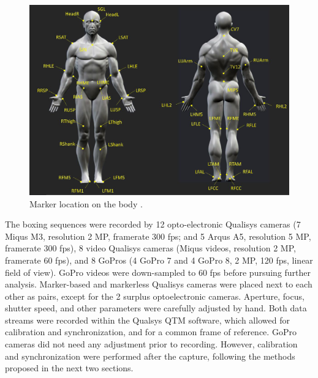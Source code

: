 \begin{figure}[!ht]
	\centering
	\def\svgwidth{1\columnwidth} 
	\fontsize{10pt}{10pt}\selectfont
	\includegraphics[width=\linewidth]{"../Chap6/Figures/Fig_MkBoxe.PNG"}
	\caption{Marker location on the body \cite{Lahkar2022b}.}
	\label{fig_mkboxe}
\end{figure}

The boxing sequences were recorded by 12 opto-electronic Qualisys cameras (7 Miqus M3, resolution 2 MP, framerate 300 fps; and 5 Arqus A5, resolution 5 MP, framerate 300 fps), 8 video Qualisys cameras (Miqus videos, resolution 2 MP, framerate 60 fps), and 8 GoPros (4 GoPro 7 and 4 GoPro 8, 2 MP, 120 fps, linear field of view). GoPro videos were down-sampled to 60 fps before pursuing further analysis. Marker-based and markerless Qualisys cameras were placed next to each other as pairs, except for the 2 surplus optoelectronic cameras. Aperture, focus, shutter speed, and other parameters were carefully adjusted by hand. Both data streams were recorded within the Qualsys QTM software, which allowed for calibration and synchronization, and for a common frame of reference. GoPro cameras did not need any adjustment prior to recording. However, calibration and synchronization were performed after the capture, following the methods proposed in the next two sections. 


